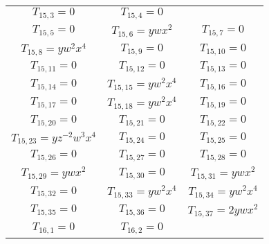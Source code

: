 \documentclass[12pt]{memoireuqam1.3}
\begin{document}
\begin{longtable}{|c|c|c|}
$T_{15,3}= 0$&

$T_{15,4}= 0$\\

$T_{15,5}= 0$&

$T_{15,6}= ywx^2$&

$T_{15,7}= 0$\\

$T_{15,8}= yw^2x^4$&

$T_{15,9}= 0$&

$T_{15,10}= 0$\\

$T_{15,11}= 0$&

$T_{15,12}= 0$&

$T_{15,13}= 0$\\

$T_{15,14}= 0$&

$T_{15,15}= yw^2x^4$&

$T_{15,16}= 0$\\

$T_{15,17}= 0$&

$T_{15,18}= yw^2x^4$&

$T_{15,19}= 0$\\

$T_{15,20}= 0$&

$T_{15,21}= 0$&

$T_{15,22}= 0$\\

$T_{15,23}= yz^{-2}w^3x^4$&

$T_{15,24}= 0$&

$T_{15,25}= 0$\\

$T_{15,26}= 0$&

$T_{15,27}= 0$&

$T_{15,28}= 0$\\

$T_{15,29}= ywx^2$&

$T_{15,30}= 0$&

$T_{15,31}= ywx^2$\\

$T_{15,32}= 0$&

$T_{15,33}= yw^2x^4$&

$T_{15,34}= yw^2x^4$\\

$T_{15,35}= 0$&

$T_{15,36}= 0$&

$T_{15,37}= 2ywx^2$\\

$T_{16,1}= 0$&

$T_{16,2}= 0$&


\end{longtable}
\end{document}
